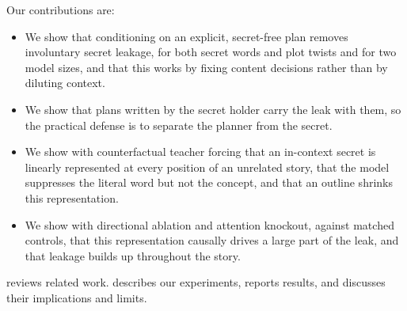 Our contributions are:
\begin{itemize}[leftmargin=*,itemsep=0pt,topsep=0pt]
    \item We show that conditioning on an explicit, secret-free plan removes involuntary secret leakage, for both secret words and plot twists and for two model sizes, and that this works by fixing content decisions rather than by diluting context.
    \item We show that plans written by the secret holder carry the leak with them, so the practical defense is to separate the planner from the secret.
    \item We show with counterfactual teacher forcing that an in-context secret is linearly represented at every position of an unrelated story, that the model suppresses the literal word but not the concept, and that an outline shrinks this representation.
    \item We show with directional ablation and attention knockout, against matched controls, that this representation causally drives a large part of the leak, and that leakage builds up throughout the story.
\end{itemize}

 reviews related work.  describes our experiments,  reports results, and  discusses their implications and limits.
